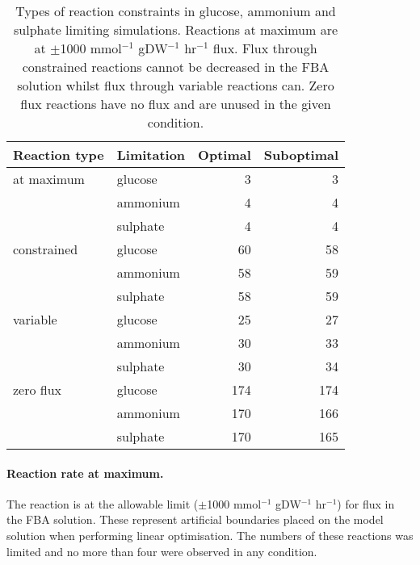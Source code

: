 \begin{table}%
  \centering
  \begin{tabular}{l l r r}
                                                         \toprule
    Reaction type & Limitation & Optimal & Suboptimal \\ \midrule
    at maximum    & glucose    &       3 &          3 \\
                  & ammonium   &       4 &          4 \\
                  & sulphate   &       4 &          4 \\
    constrained   & glucose    &      60 &         58 \\
                  & ammonium   &      58 &         59 \\
                  & sulphate   &      58 &         59 \\
    variable      & glucose    &      25 &         27 \\
                  & ammonium   &      30 &         33 \\
                  & sulphate   &      30 &         34 \\
    zero flux     & glucose    &     174 &        174 \\
                  & ammonium   &     170 &        166 \\
                  & sulphate   &     170 &        165 \\ \bottomrule
  \end{tabular}
  \caption[Types of reaction constraints in glucose, ammonium and sulphate limitation]{Types of reaction constraints in glucose, ammonium and sulphate limiting simulations. Reactions at maximum are at $\pm$1000 mmol$^{-1}$ gDW$^{-1}$ hr$^{-1}$ flux. Flux through constrained reactions cannot be decreased in the FBA solution whilst flux through variable reactions can. Zero flux reactions have no flux and are unused in the given condition. }
  \label{table:reaction_use}
\end{table}%

\paragraph{Reaction rate at maximum.} The reaction is at the allowable limit ($\pm$1000 mmol$^{-1}$ gDW$^{-1}$ hr$^{-1}$) for flux in the FBA solution. These represent artificial boundaries placed on the model solution when performing linear optimisation. The numbers of these reactions was limited and no more than four were observed in any condition.

